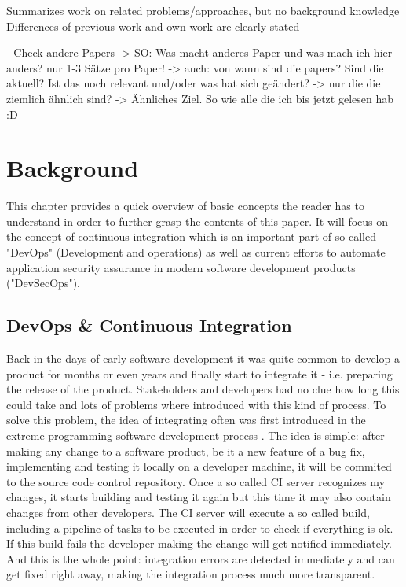 \documentclass[conference]{IEEEtran}
\begin{document}
Summarizes work on related problems/approaches, but no background knowledge
 Differences of previous work and own work are clearly stated

- Check andere Papers
-> SO: Was macht anderes Paper und was mach ich hier anders? nur 1-3 Sätze pro Paper!
-> auch: von wann sind die papers? Sind die aktuell? Ist das noch relevant und/oder was hat sich geändert?
-> nur die die ziemlich ähnlich sind? -> Ähnliches Ziel. So wie alle die ich bis jetzt gelesen hab :D


\section{Background}

This chapter provides a quick overview of basic concepts the reader has to understand in order to further grasp the contents of this paper. It will focus on the concept of continuous integration which is an important part of so called "DevOps" (Development and operations) as well as current efforts to automate application security assurance in modern software development products ("DevSecOps").

\subsection{DevOps \& Continuous Integration}

Back in the days of early software development it was quite common to develop a product for months or even years and finally start to integrate it - i.e. preparing the release of the product. Stakeholders and developers had no clue how long this could take and lots of problems where introduced with this kind of process. To solve this problem, the idea of integrating often was first introduced in the extreme programming software development process \cite{xp}. The idea is simple: after making any change to a software product, be it a new feature of a bug fix, implementing and testing it locally on a developer machine, it will be commited to the source code control repository. Once a so called CI server recognizes my changes, it starts building and testing it again but this time it may also contain changes from other developers. The CI server will execute a so called build, including a pipeline of tasks to be executed in order to check if everything is ok. If this build fails the developer making the change will get notified immediately. And this is the whole point: integration errors are detected immediately and can get fixed right away, making the integration process much more transparent.
\end{document}
